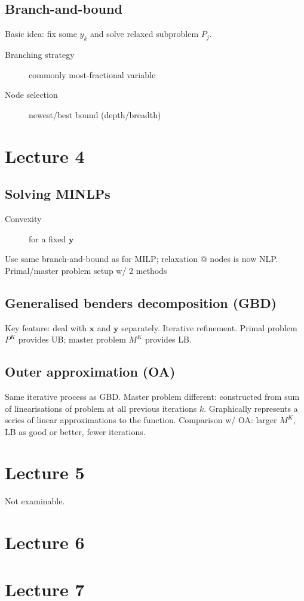 \documentclass[a4paper,twocolumn,10pt]{article}
\begin{document}
\subsection{Branch-and-bound}
Basic idea: fix some $y_k$ and solve relaxed subproblem $P_j$.
\begin{description}
    \item[Branching strategy] commonly most-fractional variable
    \item[Node selection] newest/best bound (depth/breadth)
\end{description}

\section{Lecture 4}
\subsection{Solving MINLPs}
\begin{description}
    \item[Convexity] for a fixed $\boldsymbol{y}$
\end{description}
Use same branch-and-bound as for MILP; relaxation @ nodes is now NLP. Primal/master problem setup w/ 2 methods
\subsection{Generalised benders decomposition (GBD)}
Key feature: deal with $\boldsymbol{x}$ and $\boldsymbol{y}$ separately. Iterative refinement. Primal problem $P^K$ provides UB; master problem $M^K$ provides LB.
\subsection{Outer approximation (OA)}
Same iterative process as GBD. Master problem different: constructed from sum of linearisations of problem at all previous iterations $k$. Graphically represents a series of linear approximations to the function.
Comparison w/ OA: larger $M^K$, LB as good or better, fewer iterations.

\section{Lecture 5}

Not examinable.

\section{Lecture 6}

\section{Lecture 7}
\end{document}
